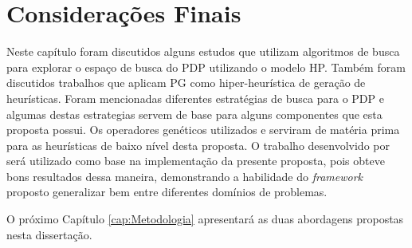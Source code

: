 \section{Considerações Finais}
\label{TrabalhosRelacionados:Conclusão}

Neste capítulo foram discutidos alguns estudos que utilizam algoritmos de busca para explorar o espaço de busca do PDP utilizando o modelo HP. Também foram discutidos trabalhos que aplicam PG como hiper-heurística de geração de heurísticas. Foram mencionadas diferentes estratégias de busca para o PDP e algumas destas estrategias servem de base para alguns componentes que esta proposta possui. Os operadores genéticos utilizados \cite{custodio2014multiple} e \cite{lin2011protein} serviram de matéria prima para as heurísticas de baixo nível desta proposta. O trabalho desenvolvido por \cite{sabar2015automatic} será utilizado como base na implementação da presente proposta, pois obteve bons resultados dessa maneira, demonstrando a habilidade do \textit{framework} proposto generalizar bem entre diferentes domínios de problemas.

O próximo Capítulo \ref{cap:Metodologia} apresentará as duas abordagens propostas nesta dissertação. 